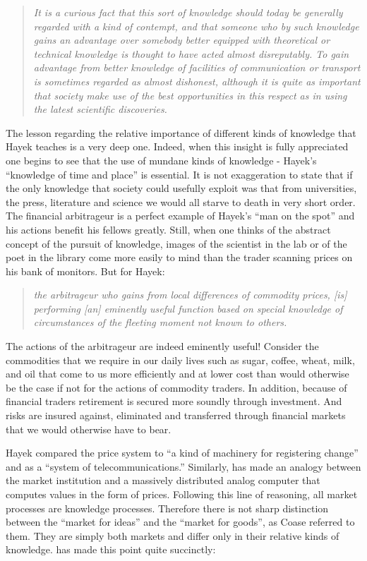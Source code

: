 \documentclass[11pt,]{article}
\begin{document}
\begin{quote}
\emph{It is a curious fact that this sort of knowledge should today be
generally regarded with a kind of contempt, and that someone who by such
knowledge gains an advantage over somebody better equipped with
theoretical or technical knowledge is thought to have acted almost
disreputably. To gain advantage from better knowledge of facilities of
communication or transport is sometimes regarded as almost dishonest,
although it is quite as important that society make use of the best
opportunities in this respect as in using the latest scientific
discoveries.}
\end{quote}

The lesson regarding the relative importance of different kinds of
knowledge that Hayek teaches is a very deep one. Indeed, when this
insight is fully appreciated one begins to see that the use of mundane
kinds of knowledge - Hayek's ``knowledge of time and place'' is
essential. It is not exaggeration to state that if the only knowledge
that society could usefully exploit was that from universities, the
press, literature and science we would all starve to death in very short
order. The financial arbitrageur is a perfect example of Hayek's ``man
on the spot'' and his actions benefit his fellows greatly. Still, when
one thinks of the abstract concept of the pursuit of knowledge, images
of the scientist in the lab or of the poet in the library come more
easily to mind than the trader scanning prices on his bank of monitors.
But for Hayek:

\begin{quote}
\emph{the arbitrageur who gains from local differences of commodity
prices, {[}is{]} performing {[}an{]} eminently useful function based on
special knowledge of circumstances of the fleeting moment not known to
others.}
\end{quote}

The actions of the arbitrageur are indeed eminently useful! Consider the
commodities that we require in our daily lives such as sugar, coffee,
wheat, milk, and oil that come to us more efficiently and at lower cost
than would otherwise be the case if not for the actions of commodity
traders. In addition, because of financial traders retirement is secured
more soundly through investment. And risks are insured against,
eliminated and transferred through financial markets that we would
otherwise have to bear.

Hayek compared the price system to ``a kind of machinery for registering
change'' and as a ``system of telecommunications.'' Similarly,
\citet{Scarf1990} has made an analogy between the market institution and
a massively distributed analog computer that computes values in the form
of prices. Following this line of reasoning, all market processes are
knowledge processes. Therefore there is not sharp distinction between
the ``market for ideas'' and the ``market for goods'', as Coase referred
to them. They are simply both markets and differ only in their relative
kinds of knowledge. \citet{Sowell1996} has made this point quite
succinctly:
\end{document}
